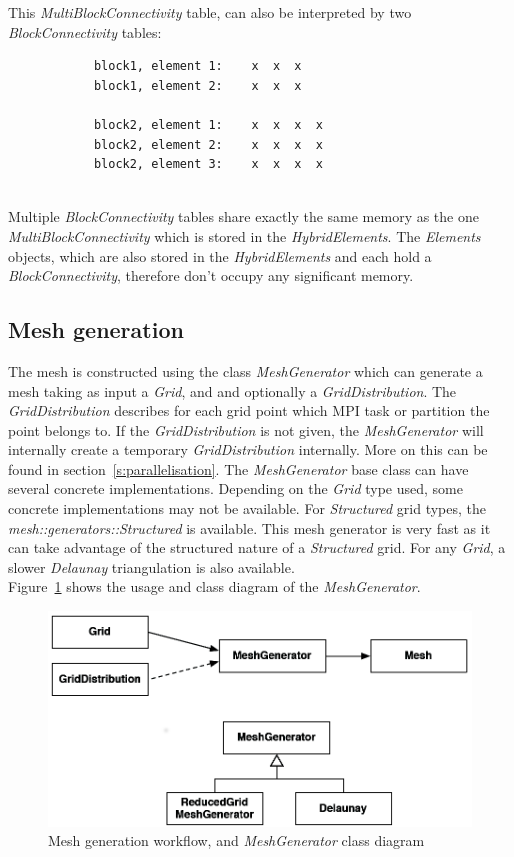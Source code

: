 This \emph{MultiBlockConnectivity} table, can also be interpreted by two \emph{BlockConnectivity} tables:\\[10pt]
\begin{minipage}{\textwidth}
\begin{verbatim}
            block1, element 1:    x  x  x
            block1, element 2:    x  x  x
                                 
            block2, element 1:    x  x  x  x
            block2, element 2:    x  x  x  x
            block2, element 3:    x  x  x  x
\end{verbatim}
\end{minipage}\\[10pt]
Multiple \emph{BlockConnectivity} tables share exactly the same memory as the
one \emph{MultiBlockConnectivity} which is stored in the \emph{HybridElements}.
The \emph{Elements} objects, which are also stored in the \emph{HybridElements}
and each hold a \emph{BlockConnectivity}, therefore don't occupy any 
significant memory.

\subsection{Mesh generation}
%
The mesh is constructed using the class \emph{MeshGenerator} which can generate
a mesh taking as input a \emph{Grid}, and and optionally a
\emph{GridDistribution}. The \emph{GridDistribution} describes for each grid
point which MPI task or partition the point belongs to. If the
\emph{GridDistribution} is not given, the \emph{MeshGenerator} will internally
create a temporary \emph{GridDistribution} internally. More on this can be
found in section~\ref{s:parallelisation}.
The \emph{MeshGenerator} base class can have several concrete implementations.
Depending on the \emph{Grid} type used, some concrete implementations may not
be available. For \emph{Structured} grid types, the
\emph{mesh::generators::Structured} is available. This mesh generator is very
fast as it can take advantage of the structured nature of a \emph{Structured}
grid. For any \emph{Grid}, a slower \emph{Delaunay} triangulation is also
available.\\
%
Figure~\ref{fig:meshgen} shows the usage and class diagram of the
\emph{MeshGenerator}.
%
\begin{figure}
\centering
\includegraphics[scale=0.25]{imgs/mesh1.png}
\caption{Mesh generation workflow, and \emph{MeshGenerator} class diagram
\label{fig:meshgen}}
\end{figure}


